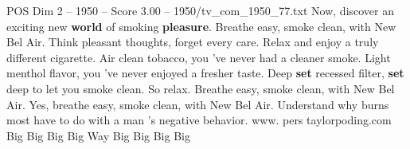 \begin{textsample}{POS Dim 2 – 1950 – Score 3.00 – 1950/tv\_com\_1950\_77.txt}  \label{ex:f2_pos_012}
Now, discover an exciting new \textbf{world} of smoking \textbf{pleasure}.
Breathe easy, smoke clean, with New Bel Air.
Think pleasant thoughts, forget every care.
Relax and enjoy a truly different cigarette.
Air clean tobacco, you 've never had a cleaner smoke.
Light menthol flavor, you 've never enjoyed a fresher taste.
Deep \textbf{set} recessed filter, \textbf{set} deep to let you smoke clean.
So relax.
Breathe easy, smoke clean, with New Bel Air.
Yes, breathe easy, smoke clean, with New Bel Air.
Understand why burns most have to do with a man 's negative behavior. www. pers taylorpoding.com Big Big Big Big Way Big Big Big Big

\end{textsample}
